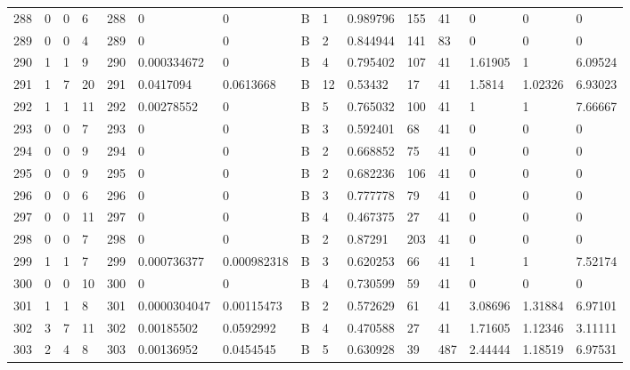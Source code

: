 \begin{latin}
\begin{longtable}{lllllllllllllll}
	288 & 0  & 0   & 6  & 288 & 0              & 0              & B & 1  & 0.989796 & 155  & 41   & 0       & 0       & 0       \\
	289 & 0  & 0   & 4  & 289 & 0              & 0              & B & 2  & 0.844944 & 141  & 83   & 0       & 0       & 0       \\
	290 & 1  & 1   & 9  & 290 & 0.000334672    & 0              & B & 4  & 0.795402 & 107  & 41   & 1.61905 & 1       & 6.09524 \\
	291 & 1  & 7   & 20 & 291 & 0.0417094      & 0.0613668      & B & 12 & 0.53432  & 17   & 41   & 1.5814  & 1.02326 & 6.93023 \\
	292 & 1  & 1   & 11 & 292 & 0.00278552     & 0              & B & 5  & 0.765032 & 100  & 41   & 1       & 1       & 7.66667 \\
	293 & 0  & 0   & 7  & 293 & 0              & 0              & B & 3  & 0.592401 & 68   & 41   & 0       & 0       & 0       \\
	294 & 0  & 0   & 9  & 294 & 0              & 0              & B & 2  & 0.668852 & 75   & 41   & 0       & 0       & 0       \\
	295 & 0  & 0   & 9  & 295 & 0              & 0              & B & 2  & 0.682236 & 106  & 41   & 0       & 0       & 0       \\
	296 & 0  & 0   & 6  & 296 & 0              & 0              & B & 3  & 0.777778 & 79   & 41   & 0       & 0       & 0       \\
	297 & 0  & 0   & 11 & 297 & 0              & 0              & B & 4  & 0.467375 & 27   & 41   & 0       & 0       & 0       \\
	298 & 0  & 0   & 7  & 298 & 0              & 0              & B & 2  & 0.87291  & 203  & 41   & 0       & 0       & 0       \\
	299 & 1  & 1   & 7  & 299 & 0.000736377    & 0.000982318    & B & 3  & 0.620253 & 66   & 41   & 1       & 1       & 7.52174 \\
	300 & 0  & 0   & 10 & 300 & 0              & 0              & B & 4  & 0.730599 & 59   & 41   & 0       & 0       & 0       \\
	301 & 1  & 1   & 8  & 301 & 0.0000304047   & 0.00115473     & B & 2  & 0.572629 & 61   & 41   & 3.08696 & 1.31884 & 6.97101 \\
	302 & 3  & 7   & 11 & 302 & 0.00185502     & 0.0592992      & B & 4  & 0.470588 & 27   & 41   & 1.71605 & 1.12346 & 3.11111 \\
	303 & 2  & 4   & 8  & 303 & 0.00136952     & 0.0454545      & B & 5  & 0.630928 & 39   & 487  & 2.44444 & 1.18519 & 6.97531 \\

\end{longtable}
\end{latin}
